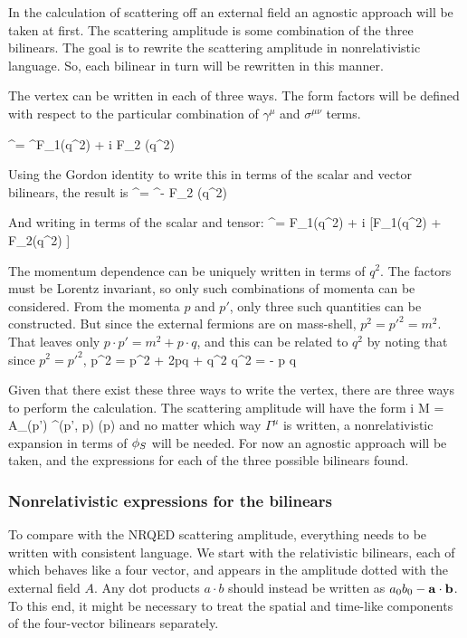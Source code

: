 In the calculation of scattering off an external field an agnostic approach will be taken at first.  The scattering amplitude is some combination of the three bilinears.  The goal is to rewrite the scattering amplitude in nonrelativistic language.  So, each bilinear in turn will be rewritten in this manner.

The vertex can be written in each of three ways.  The form factors will be defined with respect to the particular combination of $\gamma^\mu$ and $\sigma^{\mu\nu}$ terms.

\beq
	\Gamma^\mu = \gamma^\mu F_1(q^2) + i  F_2 (q^2)
\eeq

Using the Gordon identity to write this in terms of the scalar and vector bilinears, the result is
\beq
	\Gamma^\mu = \gamma^\mu [F_1(q^2) + F_2(q^2) ]  -  F_2 (q^2)
\eeq

And writing in terms of the scalar and tensor:
\beq
	\Gamma^\mu =  F_1(q^2) + i  [F_1(q^2) + F_2(q^2) ] 
\eeq

The momentum dependence can be uniquely written in terms of $q^2$.  The factors must be Lorentz invariant, so only such combinations of momenta can be considered.  From the momenta $p$ and $p'$, only three such quantities can be constructed.  But since the external fermions are on mass-shell, $p^2 = p'^2 = m^2$.  That leaves only $p \cdot p' = m^2 + p \cdot q$, and this can be related to $q^2$ by noting that since $p^2 = p'^2$,
\beq
	p^2 = p^2 + 2p\cdot q + q^2  \to q^2 = - p \cdot q
\eeq


Given that there exist these three ways to write the vertex, there are three ways to perform the calculation.  The scattering amplitude will have the form
\beq	
	i M = 	A_\mu \srb(p') \Gamma^\mu(p', p) \sr(p) 
\eeq
and no matter which way $\Gamma^\mu$ is written, a nonrelativistic expansion in terms of $\phi_S$ will be needed.  For now an agnostic approach will be taken, and the expressions for each of the three possible bilinears found.


\subsubsection{Nonrelativistic expressions for the bilinears}
To compare with the NRQED scattering amplitude, everything needs to be written with consistent language.  We start with the relativistic bilinears, each of which behaves like a four vector, and appears in the amplitude dotted with the external field $A$.  Any dot products $a \cdot b$ should instead be written as $a_0 b_0 - \mathbf{a} \cdot \mathbf{b}$.  To this end, it might be necessary to treat the spatial and time-like components of the four-vector bilinears separately.

